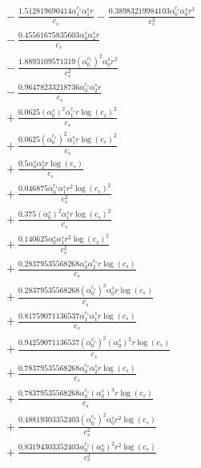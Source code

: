 \documentclass[10pt]{article}
\begin{document}
\begin{align*}
&{}  - \frac{1.512819690414 \alpha_{1}^{c_s} \alpha_{1}^s r}{c_{s}} - \frac{0.38983219984103 \alpha_{0}^{c_s} \alpha_{0}^s r^{3}}{c_{s}^{3}} \\
&{}  - \frac{0.45561675835603 \alpha_{0}^s \alpha_{2}^s r}{c_{s}} \\
&{}  - \frac{1.8893109571319 \left(\alpha_{0}^{c_s}\right)^{2} \alpha_{0}^s r^{2}}{c_{s}^{2}} \\
&{}  - \frac{0.96478233218736 \alpha_{0}^{c_s} \alpha_{2}^s r}{c_{s}} \\
&{}  + \frac{0.0625 \left(\alpha_{0}^s\right)^{2} \alpha_{1}^{c_s} r \log{\left(c_{s} \right)}^{2}}{c_{s}} \\
&{}  + \frac{0.0625 \left(\alpha_{0}^{c_s}\right)^{2} \alpha_{1}^s r \log{\left(c_{s} \right)}^{2}}{c_{s}} \\
&{}  + \frac{0.5 \alpha_{0}^s \alpha_{2}^s r \log{\left(c_{s} \right)}}{c_{s}} \\
&{}  + \frac{0.046875 \alpha_{0}^{c_s} \alpha_{1}^s r^{2} \log{\left(c_{s} \right)}^{2}}{c_{s}^{2}} \\
&{}  + \frac{0.375 \left(\alpha_{0}^s\right)^{2} \alpha_{1}^s r \log{\left(c_{s} \right)}^{2}}{c_{s}} \\
&{}  + \frac{0.140625 \alpha_{0}^s \alpha_{1}^s r^{2} \log{\left(c_{s} \right)}^{2}}{c_{s}^{2}} \\
&{}  + \frac{0.28379535568268 \alpha_{0}^s \alpha_{2}^{c_s} r \log{\left(c_{s} \right)}}{c_{s}} \\
&{}  + \frac{0.28379535568268 \left(\alpha_{0}^{c_s}\right)^{3} \alpha_{0}^s r \log{\left(c_{s} \right)}}{c_{s}} \\
&{}  + \frac{0.81759071136537 \alpha_{1}^{c_s} \alpha_{1}^s r \log{\left(c_{s} \right)}}{c_{s}} \\
&{}  + \frac{0.94259071136537 \left(\alpha_{0}^{c_s}\right)^{2} \left(\alpha_{0}^s\right)^{2} r \log{\left(c_{s} \right)}}{c_{s}} \\
&{}  + \frac{0.78379535568268 \alpha_{0}^{c_s} \alpha_{2}^s r \log{\left(c_{s} \right)}}{c_{s}} \\
&{}  + \frac{0.78379535568268 \alpha_{0}^{c_s} \left(\alpha_{0}^s\right)^{3} r \log{\left(c_{s} \right)}}{c_{s}} \\
&{}  + \frac{0.48819303352403 \left(\alpha_{0}^{c_s}\right)^{2} \alpha_{0}^s r^{2} \log{\left(c_{s} \right)}}{c_{s}^{2}} \\
&{}  + \frac{0.83194303352403 \alpha_{0}^{c_s} \left(\alpha_{0}^s\right)^{2} r^{2} \log{\left(c_{s} \right)}}{c_{s}^{2}} \\

\end{align*}
\end{document}
